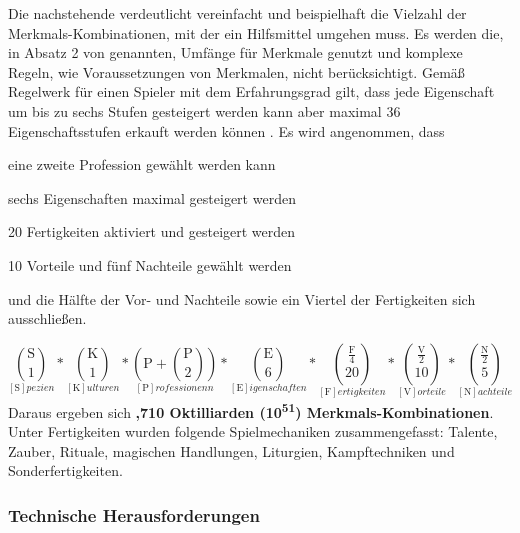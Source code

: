 Die nachstehende  verdeutlicht vereinfacht und beispielhaft die Vielzahl der Merkmals-Kombinationen, mit der ein Hilfsmittel umgehen muss.
Es werden die, in Absatz 2 von  genannten, Umfänge für Merkmale genutzt und komplexe Regeln, wie \zB Voraussetzungen von Merkmalen, nicht berücksichtigt.
Gemäß Regelwerk für einen Spieler mit dem Erfahrungsgrad  gilt, dass jede Eigenschaft um bis zu sechs Stufen gesteigert werden kann aber maximal 36 Eigenschaftsstufen erkauft werden können .
Es wird angenommen, dass
\begin{itemize*}[label={}, itemjoin={,}]
    \item eine zweite Profession gewählt werden kann
    \item sechs Eigenschaften maximal gesteigert werden
    \item 20 Fertigkeiten aktiviert und gesteigert werden
    \item 10 Vorteile und fünf Nachteile gewählt werden
    \item und die Hälfte der Vor- und Nachteile sowie ein Viertel der Fertigkeiten sich ausschließen.
\end{itemize*}
\begin{equation}
    \label{eq:merkmals-kombinationen}
    \underset{[\textrm{S}]pezien}{
        \binom{\textrm{S}}{1}
    } *
    \underset{[\textrm{K}]ulturen}{
        \binom{\textrm{K}}{1}
    } *
    \underset{[\textrm{P}]rofessionenn}{
        \left( \textrm{P} + \binom{\textrm{P}}{2} \right)
    } *
    \underset{[\textrm{E}]igenschaften}{
        \binom{\textrm{E}}{6}
    } *
    \underset{[\textrm{F}]ertigkeiten}{
        \binom{\frac{\textrm{F}}{4}}{20}
    } *
    \underset{[\textrm{V}]orteile}{
        \binom{\frac{\textrm{V}}{2}}{10}
    } *
    \underset{[\textrm{N}]achteile}{
        \binom{\frac{\textrm{N}}{2}}{5}
    }
\end{equation}
Daraus ergeben sich \textbf{,710 Oktilliarden (10\textsuperscript{51}) Merkmals-Kombinationen}.
Unter Fertigkeiten wurden folgende Spielmechaniken zusammengefasst: Talente, Zauber, Rituale, magischen Handlungen, Liturgien, Kampftechniken und Sonderfertigkeiten.


\subsubsection{Technische Herausforderungen}
\label{subsubsec:technische-herausforderungen}

